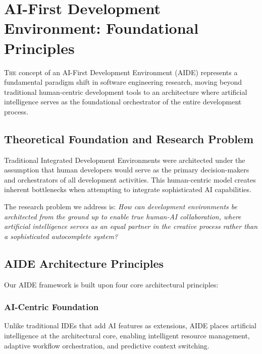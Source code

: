 
\section{AI-First Development Environment: Foundational Principles}
\label{sec:aide-concept}

\lettrine{T}{he} concept of an AI-First Development Environment (AIDE) represents a fundamental paradigm shift in software engineering research, moving beyond traditional human-centric development tools to an architecture where artificial intelligence serves as the foundational orchestrator of the entire development process.

\subsection{Theoretical Foundation and Research Problem}

Traditional Integrated Development Environments were architected under the assumption that human developers would serve as the primary decision-makers and orchestrators of all development activities. This human-centric model creates inherent bottlenecks when attempting to integrate sophisticated AI capabilities.

The research problem we address is: \textit{How can development environments be architected from the ground up to enable true human-AI collaboration, where artificial intelligence serves as an equal partner in the creative process rather than a sophisticated autocomplete system?}

\subsection{AIDE Architecture Principles}

Our AIDE framework is built upon four core architectural principles:

\subsubsection{AI-Centric Foundation}

Unlike traditional IDEs that add AI features as extensions, AIDE places artificial intelligence at the architectural core, enabling intelligent resource management, adaptive workflow orchestration, and predictive context switching.

